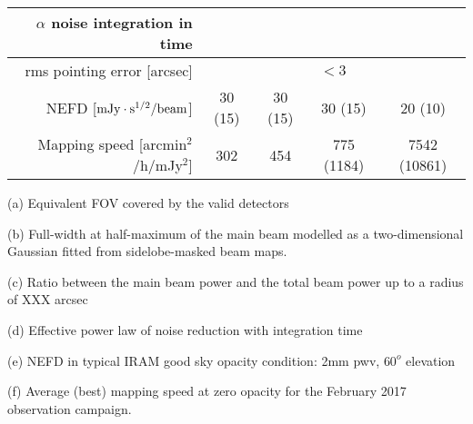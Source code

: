 \begin{table}[h]
\begin{threeparttable}
\begin{tabular}{|r|c|c|c|c|}
      \hline
      $\alpha$ noise integration in time\tnote{d}\hspace{1mm}  &   &   &   &  \\
      \hline
      rms pointing error    [arcsec]    & \multicolumn{4}{|c|}{$<3$} \\
      \hline
      NEFD\tnote{e}\hspace{1mm}   [$\rm{mJy} \cdot \rm{s}^{1/2}/\rm{beam}$]  &  30 (15)   & 30 (15)  &  30 (15)  & 20 (10) \\
      Mapping speed\tnote{f}\hspace{1mm} [arcmin$^2$/h/mJy$^2$] & 302  & 454  & 775 (1184)  & 7542 (10861) \\
\hline

\end{tabular}
  \begin{tablenotes}
    
  \item[(a)] Equivalent FOV covered by the valid detectors
  \item[(b)] Full-width at half-maximum of the main beam modelled as a two-dimensional Gaussian fitted from sidelobe-masked beam maps.
  \item[(c)]  Ratio between the main beam power and the total beam power up to a radius of XXX arcsec
  \item[(d)] Effective power law of noise reduction with integration time
  \item[(e)] NEFD in typical IRAM good sky opacity condition: 2mm pwv, $60^o$ elevation
  \item[(f)] Average (best) mapping speed at zero opacity for the February 2017 observation campaign. 

  \end{tablenotes}
\end{threeparttable}
\end{table} 
